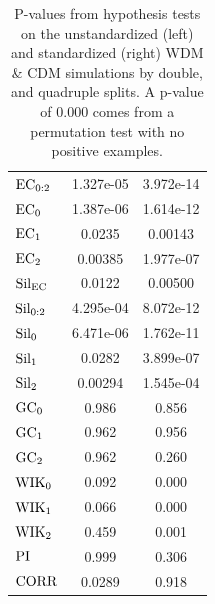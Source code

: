 \documentclass[12pt]{article}
\begin{document}
\begin{table}[htp!]
\begin{center}
\begin{tabular}{ l | c |  c }
          $\textup{EC}_{0:2}$ & 1.327e-05 &  3.972e-14 \\
          $\textup{EC}_{0}$ & 1.387e-06 & 1.614e-12 \\
          $\textup{EC}_{1}$ & 0.0235 & 0.00143 \\
          $\textup{EC}_{2}$ & 0.00385 & 1.977e-07 \\
          \midrule
          $\textup{Sil}_{\textup{EC}}$ & 0.0122 & 0.00500 \\ 
          $\textup{Sil}_{0:2}$ & 4.295e-04 & 8.072e-12 \\
          $\textup{Sil}_{0}$ & 6.471e-06 & 1.762e-11 \\
          $\textup{Sil}_{1}$ & 0.0282 & 3.899e-07 \\
          $\textup{Sil}_{2}$ & 0.00294 & 1.545e-04 \\
          \midrule
          $\textup{GC}_{0}$ & 0.986 & 0.856 \\
          $\textup{GC}_{1}$ & 0.962 & 0.956 \\
          $\textup{GC}_{2}$ & 0.962 & 0.260 \\
          \midrule
          $\textup{WIK}_{0}$ & 0.092 & 0.000 \\
          $\textup{WIK}_{1}$ & 0.066 & 0.000 \\
          $\textup{WIK}_{2}$ & 0.459 & 0.001 \\
          $\textup{PI}$ & 0.999 & 0.306 \\
          \midrule
          $\textup{CORR}$ & 0.0289 & 0.918 \\
          \bottomrule
        \end{tabular}
    \end{center}
\caption{P-values from hypothesis tests on the unstandardized (left) and standardized (right) WDM \& CDM simulations by double, and quadruple splits. A p-value of $0.000$ comes from a permutation test with no positive examples.}
\label{table:hypoCDMWDMresults}
\end{table}
\end{document}
